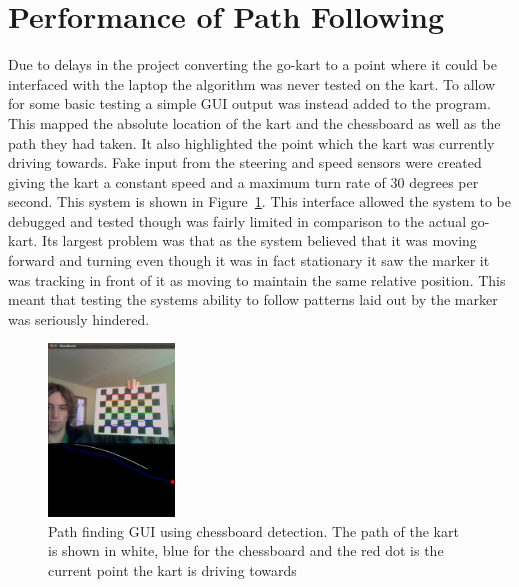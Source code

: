 \section{Performance of Path Following}

Due to delays in the project converting the go-kart to a point where it could be interfaced with the laptop the algorithm was never tested on the kart. To allow for some basic testing a simple GUI output was instead added to the program. This mapped the absolute location of the kart and the chessboard as well as the path they had taken. It also highlighted the point which the kart was currently driving towards. Fake input from the steering and speed sensors were created giving the kart a constant speed and a maximum turn rate of 30 degrees per second. This system is shown in Figure~\ref{tracking}. This interface allowed the system to be debugged and tested though was fairly limited in comparison to the actual go-kart. Its largest problem was that as the system believed that it was moving forward and turning even though it was in fact stationary it saw the marker it was tracking in front of it as moving to maintain the same relative position. This meant that testing the systems ability to follow patterns laid out by the marker was seriously hindered.

\begin{figure}[ht]
	\begin{center}
		\includegraphics[width=0.3\textwidth]{tracking}
	\end{center}
	\caption{Path finding GUI using chessboard detection. The path of the kart is shown in white, blue for the chessboard and the red dot is the current point the kart is driving towards}
	\label{tracking}
\end{figure}